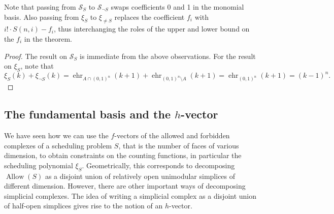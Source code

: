 \documentclass[12pt,reqno]{amsart}
\numberwithin{definition}{section}
\theoremstyle{definition}
\newcommand{\SSS}{\mathcal{S}}
\newcommand{\ehr}{\operatorname{ehr}}
\newcommand{\allow}{\operatorname{Allow}} %
\begin{document}
Note that passing from $\SSS_S$ to $\SSS_{\neg S}$ swaps coefficients 0 and 1 in the monomial basis. Also passing from $\xi_S$ to $\xi_{\neq S}$ replaces the coefficient $f_i$ with $i!\cdot S(n,i) - f_i$, thus interchanging the roles of the upper and lower bound on the $f_i$ in the theorem.

\begin{proof}
The result on $\SSS_S$ is immediate from the above observations. For the result on $\xi_S$, note that 
\[
 \xi_{S}(k) + \xi_{\neg S}(k) = \ehr_{A\cap(0,1)^n}(k+1) +  \ehr_{(0,1)^n\setminus A}(k+1) = \ehr_{(0,1)^n}(k+1) = (k-1)^n.
\]
\end{proof}

\subsection{The fundamental basis and the $h$-vector}

We have seen how we can use the $f$-vectors of the allowed and forbidden complexes of a scheduling problem $S$, that is the number of faces of various dimension, to obtain constraints on the counting functions, in particular the scheduling polynomial $\xi_S$. Geometrically, this corresponds to decomposing $\allow(S)$ as a disjoint union of relatively open unimodular simplices of different dimension. However, there are other important ways of decomposing simplicial complexes. The idea of writing a simplicial complex as a disjoint union of half-open simplices gives rise to the notion of an $h$-vector.
\end{document}
